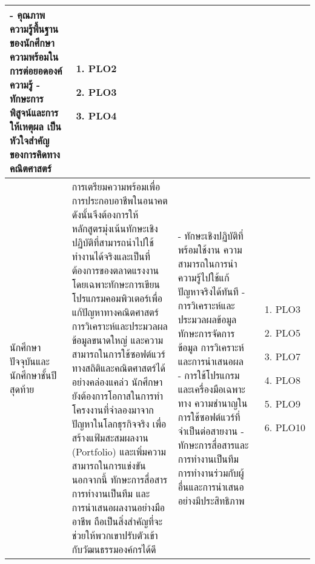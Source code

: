 \begin{longtable}{| >{\raggedright}p{} | >{\raggedright}p{} | >{\raggedright}p{} | >{\centering\arraybackslash}p{} |}
- คุณภาพความรู้พื้นฐานของนักศึกษา ความพร้อมในการต่อยอดองค์ความรู้ \newline
- ทักษะการพิสูจน์และการให้เหตุผล เป็นหัวใจสำคัญของการคิดทางคณิตศาสตร์ &
\begin{enumerate}[label={}]
	\item PLO2
	\item PLO3
	\item PLO4
\end{enumerate}
 \\
    \hline
    นักศึกษาปัจจุบันและนักศึกษาชั้นปีสุดท้าย & 
การเตรียมความพร้อมเพื่อการประกอบอาชีพในอนาคต ดังนั้นจึงต้องการให้หลักสูตรมุ่งเน้นทักษะเชิงปฏิบัติที่สามารถนำไปใช้ทำงานได้จริงและเป็นที่ต้องการของตลาดแรงงาน โดยเฉพาะทักษะการเขียนโปรแกรมคอมพิวเตอร์เพื่อแก้ปัญหาทางคณิตศาสตร์ การวิเคราะห์และประมวลผลข้อมูลขนาดใหญ่ และความสามารถในการใช้ซอฟต์แวร์ทางสถิติและคณิตศาสตร์ได้อย่างคล่องแคล่ว นักศึกษายังต้องการโอกาสในการทำโครงงานที่จำลองมาจากปัญหาในโลกธุรกิจจริง เพื่อสร้างแฟ้มสะสมผลงาน (Portfolio) และเพิ่มความสามารถในการแข่งขัน นอกจากนี้ ทักษะการสื่อสาร การทำงานเป็นทีม และการนำเสนอผลงานอย่างมืออาชีพ ถือเป็นสิ่งสำคัญที่จะช่วยให้พวกเขาปรับตัวเข้ากับวัฒนธรรมองค์กรได้ดี &
- ทักษะเชิงปฏิบัติที่พร้อมใช้งาน ความสามารถในการนำความรู้ไปใช้แก้ปัญหาจริงได้ทันที \newline
- การวิเคราะห์และประมวลผลข้อมูล ทักษะการจัดการข้อมูล การวิเคราะห์ และการนำเสนอผล \newline
- การใช้โปรแกรมและเครื่องมือเฉพาะทาง ความชำนาญในการใช้ซอฟต์แวร์ที่จำเป็นต่อสายงาน \newline
- ทักษะการสื่อสารและการทำงานเป็นทีม การทำงานร่วมกับผู้อื่นและการนำเสนออย่างมีประสิทธิภาพ &
\begin{enumerate}[label={}]
	\item PLO3
	\item PLO5
	\item PLO7
	\item PLO8
	\item PLO9
	\item PLO10
\end{enumerate}
 \\
    \hline
\end{longtable}

\begin{doclist}
\end{doclist}





